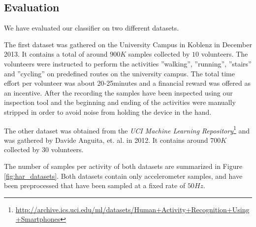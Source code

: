 

\subsection{Evaluation}\label{sec:har_eval}

We have evaluated our classifier on two different datasets.

The first dataset was gathered on the University Campus in Koblenz in
December 2013.  It contains a total of around $900K$ samples collected
by $10$ volunteers.  The volunteers were instructed to perform the
activities ''walking'', ''running'', ''stairs'' and ''cycling'' on
predefined routes on the university campus. 
The total time effort per volunteer was about 20-25minutes and a financial reward was offered as
an incentive. After the recording the samples have been inspected
using our inspection tool and the beginning and ending of the
activities were manually stripped in order to avoid noise from holding
the device in the hand.


The other dataset was obtained from the {\it UCI Machine Learning
  Repository}\footnote{\url{http://archive.ics.uci.edu/ml/datasets/Human+Activity+Recognition+Using+Smartphones}}
and was gathered by Davide Anguita, et. al. \cite{Anguita} in 2012.
It contains around $700K$ collected by 30 volunteers.

The number of samples per activity of both datasets are summarized in
Figure \ref{fig:har_datasets}. Both datasets contain only
accelerometer samples, and have been preprocessed that have been
sampled at a fixed rate of $50Hz$.

